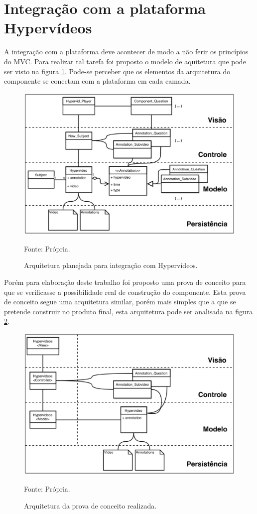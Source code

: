 \section{Integração com a plataforma Hypervídeos}

A integração com a plataforma deve acontecer de modo a não ferir os princípios do MVC. Para realizar tal tarefa foi proposto o modelo de aquitetura que pode ser visto na figura \ref{fig:arquitetura_final}. Pode-se perceber que os elementos da arquitetura do componente se conectam com a plataforma em cada camada. 

\begin{figure}[h!]
	\centering
  	\includegraphics[width=.9\linewidth]{figuras/arquitetura.eps}
  	\caption{Arquitetura planejada para integração com Hypervídeos.}
	\small{Fonte: Própria.}
  	\label{fig:arquitetura_final}
\end{figure}

Porém para elaboração deste trabalho foi proposto uma prova de conceito para que se verificasse a possibilidade real de construção do componente. Esta prova de conceito segue uma arquitetura similar, porém mais simples que a que se pretende construir no produto final, esta arquitetura pode ser analisada na figura \ref{fig:arquitetura_probe}. 

\begin{figure}[h!]
	\centering
  	\includegraphics[width=.9\linewidth]{figuras/arquitetura_simpler.eps}
  	\caption{Arquitetura da prova de conceito realizada.}
	\small{Fonte: Própria.}
  	\label{fig:arquitetura_probe}
\end{figure}

